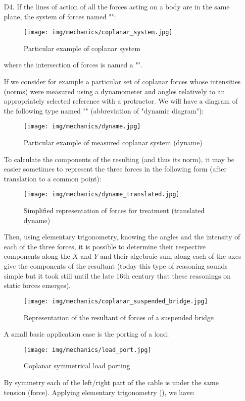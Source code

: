 \begin{enumerate}
	\item[D4.] If the lines of action of all the forces acting on a body are in the same plane, the system of forces named "":
\begin{figure}[H]
\centering
\texttt{[image: img/mechanics/coplanar\_system.jpg]}
\caption{Particular example of coplanar system}
\end{figure}
where the intersection of forces is named a "".

If we consider for example a particular set of coplanar forces whose intensities (norms) were measured using a dynamometer and angles relatively to an appropriately selected reference with a protractor. We will have a diagram of the following type named  "" (abbreviation of "dynamic diagram"):
\begin{figure}[H]
\centering
\texttt{[image: img/mechanics/dyname.jpg]}
\caption{Particular example of measured coplanar system (dyname)}
\end{figure}
To calculate the components of the resulting (and thus its norm), it may be easier sometimes to represent the three forces in the following form (after translation to a common point):
\begin{figure}[H]
\centering
\texttt{[image: img/mechanics/dyname\_translated.jpg]}
\caption{Simplified representation of forces for treatment (translated dyname)}
\end{figure}
	Then, using elementary trigonometry, knowing the angles and the intensity of each of the three forces, it is possible to determine their respective components along the $X$ and $Y$  and their algebraic sum along each of the axes give the components of the resultant (today this type of reasoning sounds simple but it took still until the late 16th century that these reasonings on static forces emerges).

\begin{figure}[H]
\centering
\texttt{[image: img/mechanics/coplanar\_suspended\_bridge.jpg]}
\caption{Representation of the resultant of forces of a suspended bridge}
\end{figure}
	A small basic application case is the porting of a load:
	\begin{figure}[H]
		\centering
		\texttt{[image: img/mechanics/load\_port.jpg]}
		\caption{Coplanar symmetrical load porting}
	\end{figure}
	By symmetry each of the left/right part of the cable is under the same tension (force). Applying elementary trigonometry (), we have:
	

\end{enumerate}
